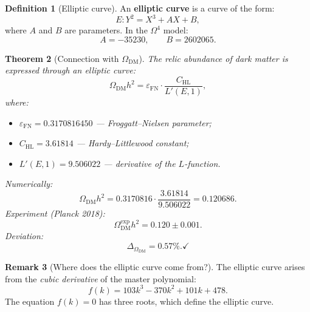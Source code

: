 \documentclass[11pt,a4paper]{article}
\newcommand{\Om}{\Omega^4}
\newcommand{\epsFN}{\varepsilon_{\text{FN}}}
\newtheorem{theorem}{Theorem}[section]
\theoremstyle{definition}
\newtheorem{definition}[theorem]{Definition}
\newtheorem{remark}[theorem]{Remark}
\begin{document}
\begin{definition}[Elliptic curve]
\label{def:elliptic-curve}
An \textbf{elliptic curve} is a curve of the form:
\begin{equation}
    E: Y^2 = X^3 + AX + B,
\end{equation}
where $A$ and $B$ are parameters. In the $\Om$ model:
\begin{equation}
    A = -35230, \qquad B = 2602065.
\end{equation}
\end{definition}

\begin{theorem}[Connection with $\Omega_{\text{DM}}$]
\label{thm:omega-dm-elliptic}
The relic abundance of dark matter is expressed through 
an elliptic curve:
\begin{equation}
    \Omega_{\text{DM}} h^2 = \epsFN \cdot \frac{C_{\text{HL}}}{L'(E,1)},
\end{equation}
where:
\begin{itemize}
    \item $\epsFN = 0.3170816450$ — Froggatt--Nielsen parameter;
    \item $C_{\text{HL}} = 3.61814$ — Hardy--Littlewood constant;
    \item $L'(E,1) = 9.506022$ — derivative of the $L$-function.
\end{itemize}
Numerically:
\begin{equation}
    \Omega_{\text{DM}} h^2 = 0.3170816 \cdot \frac{3.61814}{9.506022} 
    = 0.120686.
\end{equation}
Experiment (Planck 2018):
\begin{equation}
    \Omega_{\text{DM}}^{\text{exp}} h^2 = 0.120 \pm 0.001.
\end{equation}
Deviation:
\begin{equation}
    \Delta_{\Omega_{\text{DM}}} = \mathbf{0.57\%}. \checkmark
\end{equation}
\end{theorem}

\begin{remark}[Where does the elliptic curve come from?]
\label{rem:elliptic-origin}
The elliptic curve arises from the \emph{cubic 
derivative} of the master polynomial:
\begin{equation}
    f(k) = 103k^3 - 370k^2 + 101k + 478.
\end{equation}
The equation $f(k) = 0$ has three roots, which define 
the elliptic curve.
\end{remark}
\end{document}
